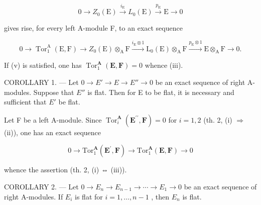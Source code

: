\[
0 \longrightarrow Z _ {0} (\mathrm{E}) \stackrel {i _ {\mathrm{E}}} {\longrightarrow} L _ {0} (\mathrm{E}) \stackrel {p _ {\mathrm{E}}} {\longrightarrow} \mathrm{E} \longrightarrow 0
\]

gives rise, for every left A-module F, to an exact sequence

\[
0 \longrightarrow \operatorname{Tor} _ {1} ^ {\mathrm{A}} (\mathrm{E}, \mathrm{F}) \longrightarrow Z _ {0} (\mathrm{E}) \otimes_ {\mathrm{A}} \mathrm{F} \xrightarrow {i _ {\mathrm{E}} \otimes 1} \mathrm{L} _ {0} (\mathrm{E}) \otimes_ {\mathrm{A}} \mathrm{F} \xrightarrow {p _ {\mathrm{E}} \otimes 1} \mathrm{E} \otimes_ {\mathrm{A}} \mathrm{F} \longrightarrow 0.
\]

If (v) is satisfied, one has \(\operatorname{Tor}_1^{\mathbf{A}}(\mathbf{E},\mathbf{F}) = 0\) whence (iii).

COROLLARY 1. --- Let \(0 \to E' \to E \to E'' \to 0\) be an exact sequence of right A-modules. Suppose that \(E''\) is flat. Then for E to be flat, it is necessary and sufficient that \(E'\) be flat.

Let F be a left A-module. Since \(\operatorname{Tor}_i^{\mathbf{A}}(\mathbf{E}^{\prime \prime},\mathbf{F}) = 0\) for \(i = 1,2\) (th. 2, (i) \(\Rightarrow\) (ii)), one has an exact sequence

\[
0 \to \mathrm{Tor} _ {1} ^ {\mathbf {A}} (\mathbf {E} ^ {\prime}, \mathbf {F}) \to \mathrm{Tor} _ {1} ^ {\mathbf {A}} (\mathbf {E}, \mathbf {F}) \to 0
\]

whence the assertion (th. 2, (i) ⇔ (iii)).

COROLLARY 2. --- Let \(0 \to E_n \to E_{n-1} \to \cdots \to E_1 \to 0\) be an exact sequence of right A-modules. If \(E_i\) is flat for \(i = 1, \ldots, n-1\) , then \(E_n\) is flat.
